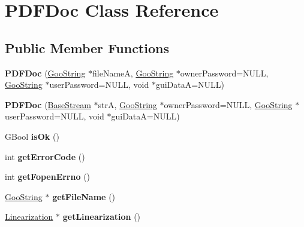 \hypertarget{class_p_d_f_doc}{}\section{P\+D\+F\+Doc Class Reference}
\label{class_p_d_f_doc}
\subsection*{Public Member Functions}
\begin{DoxyCompactItemize}
\item 
\mbox{\label{class_p_d_f_doc_a760f64e074b2fb2919b54cdcc43d7147}} 
{\bfseries P\+D\+F\+Doc} (\hyperlink{class_goo_string}{Goo\+String} $\ast$file\+NameA, \hyperlink{class_goo_string}{Goo\+String} $\ast$owner\+Password=N\+U\+LL, \hyperlink{class_goo_string}{Goo\+String} $\ast$user\+Password=N\+U\+LL, void $\ast$gui\+DataA=N\+U\+LL)
\item 
\mbox{\label{class_p_d_f_doc_af819fef1b80f0566b93418c8e65fab8c}} 
{\bfseries P\+D\+F\+Doc} (\hyperlink{class_base_stream}{Base\+Stream} $\ast$strA, \hyperlink{class_goo_string}{Goo\+String} $\ast$owner\+Password=N\+U\+LL, \hyperlink{class_goo_string}{Goo\+String} $\ast$user\+Password=N\+U\+LL, void $\ast$gui\+DataA=N\+U\+LL)
\item 
\mbox{\label{class_p_d_f_doc_af540e86e37f4b23c71946af3d0027dfa}} 
G\+Bool {\bfseries is\+Ok} ()
\item 
\mbox{\label{class_p_d_f_doc_a82e3a8dcef65c67f11eca7e15570957e}} 
int {\bfseries get\+Error\+Code} ()
\item 
\mbox{\label{class_p_d_f_doc_a439f9b441c38433efa1a2e031da2d780}} 
int {\bfseries get\+Fopen\+Errno} ()
\item 
\mbox{\label{class_p_d_f_doc_ae7522522d3639c12322f36a05d7362eb}} 
\hyperlink{class_goo_string}{Goo\+String} $\ast$ {\bfseries get\+File\+Name} ()
\item 
\mbox{\label{class_p_d_f_doc_a66eef5bf405a1873e65fb24d1206f808}} 
\hyperlink{class_linearization}{Linearization} $\ast$ {\bfseries get\+Linearization} ()
\item 

\end{DoxyCompactItemize}
